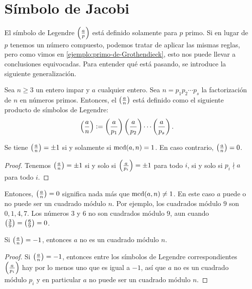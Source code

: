 \documentclass{article}
\theoremstyle{plain}
\begin{document}

\section{Símbolo de Jacobi}

El símbolo de Legendre $\left(\frac{a}{p}\right)$ está definido solamente para $p$
primo. Si en lugar de $p$ tenemos un número compuesto, podemos tratar de aplicar
las mismas reglas, pero como vimos en \ref{ejemplo:primo-de-Grothendieck}, esto
nos puede llevar a conclusiones equivocadas. Para entender qué está pasando, se
introduce la siguiente generalización.

\begin{definicion}
  Sea $n \ge 3$ un entero impar y $a$ cualquier entero. Sea
  $n = p_1 p_2 \cdots p_s$ la factorización de $n$ en números primos. Entonces,
  el  $\left(\frac{a}{n}\right)$ está definido como el siguiente
  producto de símbolos de Legendre:
  $$\left(\frac{a}{n}\right) \mathrel{\mathop:}= \left(\frac{a}{p_1}\right)\left(\frac{a}{p_2}\right)\cdots\left(\frac{a}{p_s}\right).$$
\end{definicion}

\begin{observacion}
  Se tiene $\left(\frac{a}{n}\right) = \pm 1$ si y solamente si $\operatorname{mcd} (a,n) = 1$. En caso
  contrario, $\left(\frac{a}{n}\right) = 0$.

\begin{proof}
  Tenemos $\left(\frac{a}{n}\right) = \pm 1$ si y solo si $\left(\frac{a}{p_i}\right) = \pm 1$
  para todo $i$, si y solo si $p_i \nmid a$ para todo $i$.
\end{proof}
\end{observacion}

Entonces, $\left(\frac{a}{n}\right) = 0$ significa nada más que $\operatorname{mcd} (a,n) \ne 1$. En
este caso $a$ puede o no puede ser un cuadrado módulo $n$. Por ejemplo, los
cuadrados módulo $9$ son $0,1,4,7$. Los números $3$ y $6$ no son cuadrados
módulo $9$, aun cuando $\left(\frac{3}{9}\right) = \left(\frac{6}{9}\right) = 0$.

\begin{observacion}
  Si $\left(\frac{a}{n}\right) = -1$, entonces $a$ no es un cuadrado módulo $n$.

\begin{proof}
  Si $\left(\frac{a}{n}\right) = -1$, entonces entre los símbolos de Legendre
  correspondientes $\left(\frac{a}{p_i}\right)$ hay por lo menos uno que es igual a $-1$,
  así que $a$ no es un cuadrado módulo $p_i$ y en particular $a$ no puede ser un
  cuadrado módulo $n$.
\end{proof}
\end{observacion}
\end{document}
